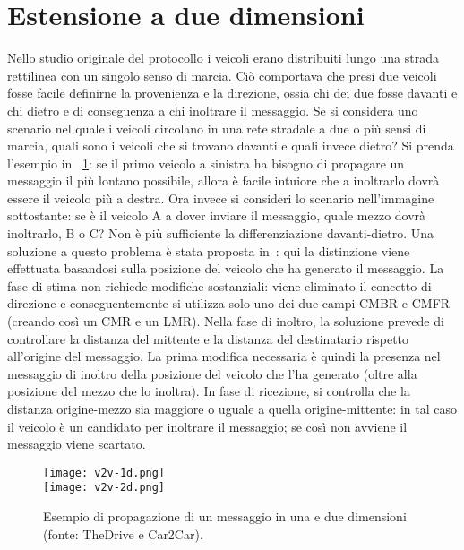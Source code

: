 \section{Estensione a due dimensioni}\label{sec:fb-estensione-due-dimensioni}
Nello studio originale del protocollo i veicoli erano distribuiti lungo una strada rettilinea con un singolo senso di marcia.
Ciò comportava che presi due veicoli fosse facile definirne la provenienza e la direzione, ossia chi dei due fosse davanti e chi dietro
e di conseguenza a chi inoltrare il messaggio.
Se si considera uno scenario nel quale i veicoli circolano in una rete stradale a due o più sensi di marcia,
quali sono i veicoli che si trovano davanti e quali invece dietro?
Si prenda l'esempio in \figurename~\ref{fig:v2v-1d-2d}:
se il primo veicolo a sinistra ha bisogno di propagare un messaggio il più lontano possibile,
allora è facile intuiore che a inoltrarlo dovrà essere il veicolo più a destra.
Ora invece si consideri lo scenario nell'immagine sottostante:
se è il veicolo A a dover inviare il messaggio, quale mezzo dovrà inoltrarlo, B o C?
Non è più sufficiente la differenziazione davanti-dietro.
Una soluzione a questo problema è stata proposta in~\cite{Barichello2017propagazione}:
qui la distinzione viene effettuata basandosi sulla posizione del veicolo che ha generato il messaggio.
La fase di stima non richiede modifiche sostanziali: viene eliminato il concetto di direzione e conseguentemente si utilizza solo uno dei due campi CMBR e CMFR
(creando così un CMR e un LMR).
Nella fase di inoltro, la soluzione prevede di controllare la distanza del mittente e la distanza del destinatario rispetto all'origine del messaggio.
La prima modifica necessaria è quindi la presenza nel messaggio di inoltro della posizione del veicolo che l'ha generato (oltre alla posizione del mezzo che lo inoltra).
In fase di ricezione, si controlla che la distanza origine-mezzo sia maggiore o uguale a quella origine-mittente: in tal caso il veicolo è un candidato per inoltrare il messaggio;
se così non avviene il messaggio viene scartato.
%
\begin{figure}[!h]
	\centering
		\texttt{[image: v2v-1d.png]} \\
		\vspace{12pt}
		\texttt{[image: v2v-2d.png]}
\caption{Esempio di propagazione di un messaggio in una e due dimensioni (fonte: TheDrive e Car2Car).\label{fig:v2v-1d-2d}}
\end{figure}
%
